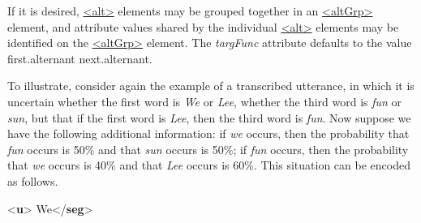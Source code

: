 If it is desired, \hyperref[TEI.alt]{<alt>} elements may be grouped together in an \hyperref[TEI.altGrp]{<altGrp>} element, and attribute values shared by the individual \hyperref[TEI.alt]{<alt>} elements may be identified on the \hyperref[TEI.altGrp]{<altGrp>} element. The {\itshape targFunc} attribute defaults to the value first.alternant next.alternant. \par
To illustrate, consider again the example of a transcribed utterance, in which it is uncertain whether the first word is \textit{We} or \textit{Lee}, whether the third word is \textit{fun} or \textit{sun}, but that if the first word is \textit{Lee}, then the third word is \textit{fun}. Now suppose we have the following additional information: if \textit{we} occurs, then the probability that \textit{fun} occurs is 50\% and that \textit{sun} occurs is 50\%; if \textit{fun} occurs, then the probability that \textit{we} occurs is 40\% and that \textit{Lee} occurs is 60\%. This situation can be encoded as follows. \par\bgroup{}\exampleFont \begin{shaded}\noindent\mbox{}{<\textbf{u}>}\mbox{}\newline 
{}We{</\textbf{seg}>}\mbox{}\newline 

\end{shaded}

